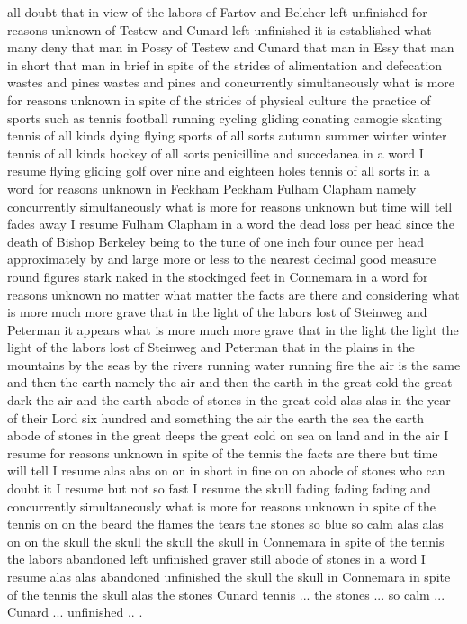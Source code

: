 all doubt that in view of the labors of Fartov and Belcher left unfinished for reasons
unknown of Testew and Cunard left unfinished it is established what many deny that man
in Possy of Testew and Cunard that man in Essy that man in short that man in brief in
spite of the strides of alimentation and defecation wastes and pines wastes and pines and
concurrently simultaneously what is more for reasons unknown in spite of the strides of
physical culture the practice of sports such as tennis football running cycling gliding
conating camogie skating tennis of all kinds dying flying sports of all sorts autumn
summer winter winter tennis of all kinds hockey of all sorts penicilline and succedanea in
a word I resume flying gliding golf over nine and eighteen holes tennis of all sorts in a
word for reasons unknown in Feckham Peckham Fulham Clapham namely concurrently
simultaneously what is more for reasons unknown but time will tell fades away I resume
Fulham Clapham in a word the dead loss per head since the death of Bishop Berkeley
being to the tune of one inch four ounce per head approximately by and large more or
less to the nearest decimal good measure round figures stark naked in the stockinged feet
in Connemara in a word for reasons unknown no matter what matter the facts are there
and considering what is more much more grave that in the light of the labors lost of
Steinweg and Peterman it appears what is more much more grave that in the light the
light the light of the labors lost of Steinweg and Peterman that in the plains in the
mountains by the seas by the rivers running water running fire the air is the same and
then the earth namely the air and then the earth in the great cold the great dark the air and
the earth abode of stones in the great cold alas alas in the year of their Lord six hundred
and something the air the earth the sea the earth abode of stones in the great deeps the
great cold on sea on land and in the air I resume for reasons unknown in spite of the
tennis the facts are there but time will tell I resume alas alas on on in short in fine on on
abode of stones who can doubt it I resume but not so fast I resume the skull fading fading
fading and concurrently simultaneously what is more for reasons unknown in spite of the
tennis on on the beard the flames the tears the stones so blue so calm alas alas on on the
skull the skull the skull the skull in Connemara in spite of the tennis the labors abandoned
left unfinished graver still abode of stones in a word I resume alas alas abandoned
unfinished the skull the skull in Connemara in spite of the tennis the skull alas the stones
Cunard tennis ... the stones ... so calm ... Cunard ... unfinished .. .


